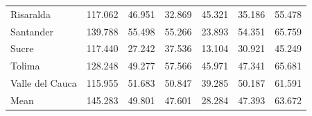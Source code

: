 \documentclass[11pt,a4paper,oneside]{article}
\begin{document}
\begin{table}
\begin{tabular}{lrrrrrr}
Risaralda          & 117.062    & 46.951                             & 32.869                     & 45.321                             & 35.186 & 55.478 \\
Santander          & 139.788    & 55.498                             & 55.266                     & 23.893                             & 54.351 & 65.759 \\
Sucre              & 117.440    & 27.242                             & 37.536                     & 13.104                             & 30.921 & 45.249 \\
Tolima             & 128.248    & 49.277                             & 57.566                     & 45.971                             & 47.341 & 65.681 \\
Valle del Cauca    & 115.955    & 51.683                             & 50.847                     & 39.285                             & 50.187 & 61.591 \\
Mean               & 145.283    & 49.801                             & 47.601                     & 28.284                             & 47.393 & 63.672 \\
\bottomrule
\end{tabular}
\end{table}

\color{black}

\vspace*{\fill}
\end{document}
